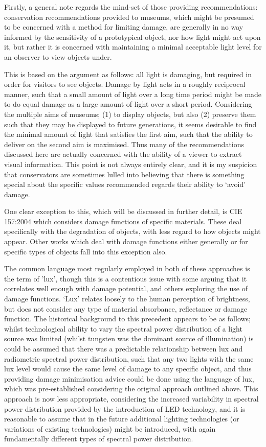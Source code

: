 Firstly, a general note regards the mind-set of those providing recommendations: conservation recommendations provided to museums, which might be presumed to be concerned with a method for limiting damage, are generally in no way informed by the sensitivity of a prototypical object, nor how light might act upon it, but rather it is concerned with maintaining a minimal acceptable light level for an observer to view objects under.

This is based on the argument as follows: all light is damaging, but required in order for visitors to see objects. Damage by light acts in a roughly reciprocal manner, such that a small amount of light over a long time period might be made to do equal damage as a large amount of light over a short period. Considering the multiple aims of museums; (1) to display objects, but also (2) preserve them such that they may be displayed to future generations, it seems desirable to find the minimal amount of light that satisfies the first aim, such that the ability to deliver on the second aim is maximised. Thus many of the recommendations discussed here are actually concerned with the ability of a viewer to extract visual information. This point is not always entirely clear, and it is my suspicion that conservators are sometimes lulled into believing that there is something special about the specific values recommended regards their ability to `avoid' damage. 

One clear exception to this, which will be discussed in further detail, is \gls{CIE} 157:2004 \citep{cie_cie_2004} which considers damage functions of specific materials. These deal specifically with the degradation of objects, with less regard to how objects might appear. Other works which deal with damage functions either generally or for specific types of objects fall into this exception also.

The common language most regularly employed in both of these approaches is the term of 'lux', though this is a contentious issue with some arguing that it correlates well enough with damage potential, and others exploring the use of damage functions. `Lux' relates loosely to the human perception of brightness, but does not consider any type of material absorbance, reflectance or damage function. The historical background to this precedent appears to be as follows; whilst technological ability to vary the spectral power distribution of a light source was limited (whilst tungsten was the dominant source of illumination) is could be assumed that there was a predictable relationship between lux and radiometric spectral power distribution, such that any two lights with the same lux level would cause the same level of damage to any specific object, and thus providing damage minimisation advice could be done using the language of lux, which was pre-established considering the original approach outlined above. This approach is now less appropriate, considering the increased variability in spectral power distribution provided by the introduction of LED technology, and it is reasonable to assume that in the future additional lighting technologies (or variations of existing technologies) might be introduced, with again fundamentally different types of spectral power distribution.

